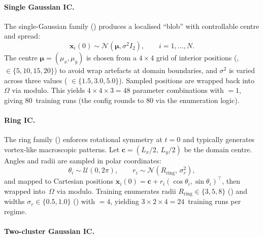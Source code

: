 \documentclass{report}
\theoremstyle{plain}
\theoremstyle{remark}
\numberwithin{equation}{section}              %
\begin{document}
\paragraph{Single Gaussian IC.}
\label{subsec:ic_gaussian}

The single-Gaussian family () produces a localised
``blob'' with controllable centre and spread:
\begin{equation}
  \mathbf{x}_i(0)\sim \mathcal{N}(\boldsymbol{\mu},\sigma^2 I_2),
  \qquad i=1,\dots,N.
  \label{eq:ic_gaussian_def}
\end{equation}
The centre $\boldsymbol{\mu}=(\mu_x,\mu_y)$ is chosen from a $4\times 4$ grid
of interior positions (, 
$\in\{5,10,15,20\}$) to avoid wrap artefacts at domain boundaries, and
$\sigma^2$ is varied across three values
( $\in\{1.5,3.0,5.0\}$).  Sampled positions are wrapped back
into~$\Omega$ via modulo.  This yields $4\times 4\times 3=48$ parameter
combinations with ${}=1$, giving
80~training runs (the config rounds to 80 via the enumeration logic).

\paragraph{Ring IC.}
\label{subsec:ic_ring}

The ring family () enforces rotational symmetry at
$t{=}0$ and typically generates vortex-like macroscopic patterns.  Let
$\mathbf{c}=(L_x/2,\,L_y/2)$ be the domain centre.  Angles and radii are
sampled in polar coordinates:
\begin{equation}
  \theta_i \sim \mathcal{U}(0,2\pi),\qquad
  r_i \sim \mathcal{N}(R_{\mathrm{ring}},\,\sigma_r^2),
  \label{eq:ic_ring_polar}
\end{equation}
and mapped to Cartesian positions
$\mathbf{x}_i(0)=\mathbf{c}+r_i(\cos\theta_i,\sin\theta_i)^\top$, then
wrapped into~$\Omega$ via modulo.  Training enumerates radii
$R_{\mathrm{ring}}\in\{3,5,8\}$ () and widths
$\sigma_r\in\{0.5,1.0\}$ () with
${}=4$, yielding $3\times 2\times 4=24$~training
runs per regime.

\paragraph{Two-cluster Gaussian IC.}
\label{subsec:ic_two_clusters}
\end{document}
